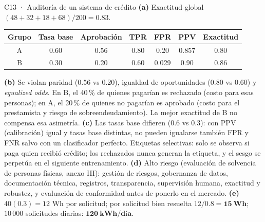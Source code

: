\begin{solucion}{C13 · Auditoría de un sistema de crédito}
\textbf{(a)} Exactitud global $(48+32+18+68)/200=\mathbf{0.83}$.
\begin{center}\small
\begin{tabular}{c|cccccc}
Grupo & Tasa base & Aprobación & TPR & FPR & PPV & Exactitud\\\hline
A & 0.60 & 0.56 & 0.80 & 0.20 & 0.857 & 0.80\\
B & 0.30 & 0.20 & 0.60 & 0.029 & 0.90 & 0.86
\end{tabular}
\end{center}
\textbf{(b)} Se violan paridad ($0.56$ vs $0.20$), igualdad de oportunidades ($0.80$ vs $0.60$) y \emph{equalized odds}. En B, el 40\,\% de quienes pagarían
es rechazado (costo para esas personas); en A, el 20\,\% de quienes no pagarían es aprobado (costo para el prestamista y riesgo de
sobreendeudamiento). La mejor exactitud de B no compensa esa asimetría.
\textbf{(c)} Las tasas base difieren (0.6 vs 0.3): con PPV (calibración) igual y tasas base distintas, no pueden igualarse también FPR y FNR salvo con un
clasificador perfecto. Etiquetas selectivas: solo se observa si paga quien recibió crédito; los rechazados nunca generan la etiqueta, y el
sesgo se perpetúa en el siguiente entrenamiento.
\textbf{(d)} Alto riesgo (evaluación de solvencia de personas físicas, anexo III): gestión de riesgos, gobernanza de datos, documentación técnica,
registros, transparencia, supervisión humana, exactitud y robustez, y evaluación de conformidad antes de ponerlo en el mercado.
\textbf{(e)} $40(0.3)=12$ Wh por solicitud; por solicitud bien resuelta $12/0.8=\mathbf{15\ Wh}$; $10\,000$ solicitudes diarias: $\mathbf{120\ kWh/día}$.
\end{solucion}
